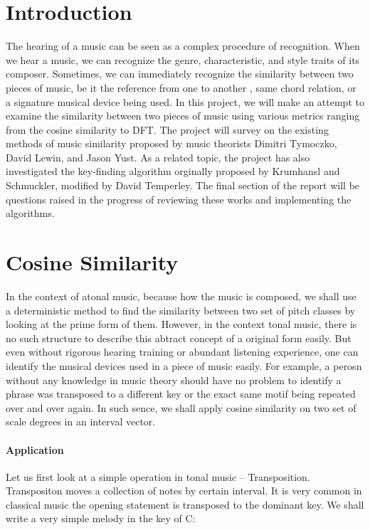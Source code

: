 \documentclass[12pt]{report}
\theoremstyle{definition}
\begin{document}
\maketitle

\setcounter{MaxMatrixCols}{20} \setlength\parindent{0pt}

\section{Introduction}
The hearing of a music can be seen as a complex procedure of recognition. 
When we hear a music, we can recognize the genre, characteristic, and 
style traits of its composer. Sometimes, we can immediately recognize
the similarity between two pieces of music, be it the reference from one to another
, same chord relation, or a signature musical device being used. In this project, 
we will make an attempt to examine the similarity between two pieces of music using 
various metrics ranging from the cosine similarity to DFT. The project will
survey on the existing methods of music similarity proposed by music theorists
Dimitri Tymoczko, David Lewin, and Jason Yust. As a related topic, the project has also
investigated the key-finding algorithm orginally proposed by Krumhansl and Schmuckler, 
modified by David Temperley. The final section of the report will be questions raised 
in the progress of reviewing these works and implementing the algorithms.

\section{Cosine Similarity}
In the context of atonal music, because how the music is composed, we shall use a 
deterministic method to find the similarity between two set of pitch classes by looking 
at the prime form of them. However, in the context tonal music, there is no such 
structure to describe this abtract concept of a original form easily. But even without 
rigorous hearing training or abundant listening experience, one can identify the
musical devices used in a piece of music easily. For example, a perosn
without any knowledge in music theory should have no problem to identify 
a phrase was transposed to a different key or the exact same motif being 
repeated over and over again. In such sence, we shall apply cosine similarity 
on two set of scale degrees in an interval vector.
\paragraph*{Application}
    Let us first look at a simple operation in tonal music -- Transposition. Transpositon moves a 
collection of notes by certain interval. It is very common in classical music the opening
statement is transposed to the dominant key. We shall
write a very simple melody in the key of C:
\end{document}
